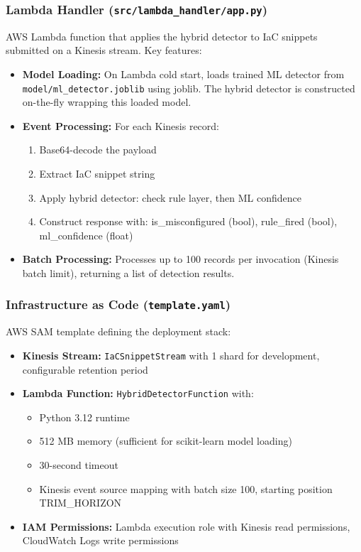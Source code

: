 \subsubsection{Lambda Handler (\texttt{src/lambda\_handler/app.py})}

AWS Lambda function that applies the hybrid detector to IaC snippets submitted on a Kinesis stream. Key features:

\begin{itemize}
  \item \textbf{Model Loading:} On Lambda cold start, loads trained ML detector from \texttt{model/ml\_detector.joblib} using joblib. The hybrid detector is constructed on-the-fly wrapping this loaded model.
  
  \item \textbf{Event Processing:} For each Kinesis record:
  \begin{enumerate}
    \item Base64-decode the payload
    \item Extract IaC snippet string
    \item Apply hybrid detector: check rule layer, then ML confidence
    \item Construct response with: is\_misconfigured (bool), rule\_fired (bool), ml\_confidence (float)
  \end{enumerate}
  
  \item \textbf{Batch Processing:} Processes up to 100 records per invocation (Kinesis batch limit), returning a list of detection results.
\end{itemize}

\subsubsection{Infrastructure as Code (\texttt{template.yaml})}

AWS SAM template defining the deployment stack:

\begin{itemize}
  \item \textbf{Kinesis Stream:} \texttt{IaCSnippetStream} with 1 shard for development, configurable retention period
  \item \textbf{Lambda Function:} \texttt{HybridDetectorFunction} with:
  \begin{itemize}
    \item Python 3.12 runtime
    \item 512 MB memory (sufficient for scikit-learn model loading)
    \item 30-second timeout
    \item Kinesis event source mapping with batch size 100, starting position TRIM\_HORIZON
  \end{itemize}
  \item \textbf{IAM Permissions:} Lambda execution role with Kinesis read permissions, CloudWatch Logs write permissions
\end{itemize}

